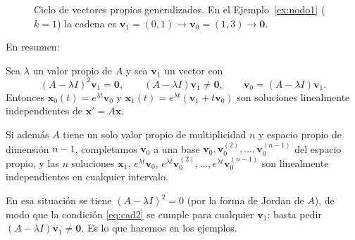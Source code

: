 \begin{figure}[H]
\centering
{}
\caption{Ciclo de vectores propios generalizados. En el Ejemplo~\ref{ex:nodo1} ($k=1$) la cadena es $\mathbf v_1=(0,1)\to\mathbf v_0=(1,3)\to\mathbf 0$.}
\label{fig:cadena}
\end{figure}

En resumen:

\begin{theorem}\label{thm:ciclo2}
Sea $\lambda$ un valor propio de $A$ y sea $\mathbf v_1$ un vector con
\[
(A-\lambda I)^2\mathbf v_1=\mathbf 0, \qquad (A-\lambda I)\mathbf v_1\neq\mathbf 0, \qquad \mathbf v_0=(A-\lambda I)\mathbf v_1.
\]
Entonces $\mathbf{x}_0(t)=e^{\lambda t}\mathbf v_0$ y $\mathbf{x}_1(t) = e^{\lambda t}(\mathbf{v}_1 + t\mathbf{v}_0)$ son soluciones linealmente independientes de $\mathbf{x}' = A\mathbf{x}$.
\end{theorem}

Si adem\'as $A$ tiene un solo valor propio de multiplicidad $n$ y espacio propio de dimensi\'on $n-1$, completamos $\mathbf v_0$ a una base $\mathbf v_0,\mathbf v_0^{(2)},\dots,\mathbf v_0^{(n-1)}$ del espacio propio, y las $n$ soluciones $\mathbf x_1$, $e^{\lambda t}\mathbf v_0$, $e^{\lambda t}\mathbf v_0^{(2)},\dots,e^{\lambda t}\mathbf v_0^{(n-1)}$ son linealmente independientes en cualquier intervalo.

\begin{note}
En esa situaci\'on se tiene $(A-\lambda I)^2=0$ (por la forma de Jordan de $A$), de modo que la condici\'on \eqref{eq:cad2} se cumple para cualquier $\mathbf v_1$: basta pedir $(A-\lambda I)\mathbf v_1\neq\mathbf 0$. Es lo que haremos en los ejemplos.
\end{note}


